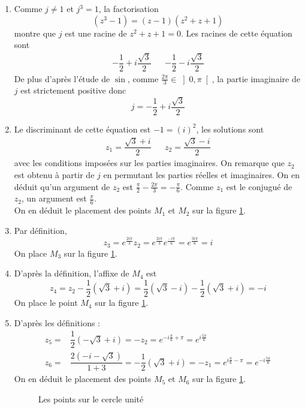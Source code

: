 \begin{enumerate}
 \item Comme $j\neq1$ et $j^3=1$, la factorisation
\begin{displaymath}
 (z^3-1)=(z-1)(z^2+z+1)
\end{displaymath}
montre que $j$ est une racine de $z^2+z+1=0$. Les racines de cette équation sont
\begin{align*}
 -\dfrac{1}{2}+i\dfrac{\sqrt{3}}{2} & & -\dfrac{1}{2}-i\dfrac{\sqrt{3}}{2}
\end{align*}
De plus d'après l'étude de $\sin$, comme $\frac{2\pi}{3}\in \left] 0,\pi\right[ $, la partie imaginaire de $j$ est strictement positive donc
\begin{displaymath}
 j = -\dfrac{1}{2}+i\dfrac{\sqrt{3}}{2}
\end{displaymath}

\item Le discriminant  de cette équation est $-1=(i)^2$, les solutions sont
\begin{align*}
 z_1=\dfrac{\sqrt{3}+i}{2} & & z_2=\dfrac{\sqrt{3}-i}{2}
\end{align*}
avec les conditions imposées sur les parties imaginaires. On remarque que $z_2$ est obtenu à partir de $j$ en permutant les parties réelles et imaginaires. On en déduit qu'un argument de $z_2$ est $\frac{\pi}{2}-\frac{2\pi}{3}=-\frac{\pi}{6}$. 
Comme $z_1$ est le conjugué de $z_2$, un argument est $\frac{\pi}{6}$.\\
On en déduit le placement des points $M_1$ et $M_2$ sur la figure \ref{fig:Ccomp1_1}.
\item Par définition,
\begin{displaymath}
 z_3 = e^{\frac{2i\pi}{3}}z_2=e^{\frac{2i\pi}{3}}e^{\frac{-i\pi}{6}}=e^{\frac{3i\pi}{6}}=i
\end{displaymath}
On place $M_3$ sur la figure \ref{fig:Ccomp1_1}.
\item D'après la définition, l'affixe de $M_4$ est
\begin{displaymath}
 z_4 = z_2 - \dfrac{1}{2}(\sqrt{3}+i)=  \dfrac{1}{2}(\sqrt{3}-i) -  \dfrac{1}{2}(\sqrt{3}+i)=-i
\end{displaymath}
On place le point $M_4$  sur la figure \ref{fig:Ccomp1_1}.
\item D'après les définitions :
\begin{align*}
 z_5 =& \dfrac{1}{2}(-\sqrt{3}+i) =-z_2=e^{-i\frac{\pi}{6}+\pi}=e^{i\frac{5\pi}{6}} \\
 z_6 =& \dfrac{2(-i-\sqrt{3})}{1+3}=-\dfrac{1}{2}(\sqrt{3}+i)=-z_1=e^{i\frac{\pi}{6}-\pi}=e^{-i\frac{5\pi}{6}}
\end{align*}
On en déduit le placement des points $M_5$ et $M_6$ sur la figure \ref{fig:Ccomp1_1}.
\begin{figure}[ht]
 \centering

\caption{Les points sur le cercle unité}
\label{fig:Ccomp1_1}
\end{figure}


\end{enumerate}
